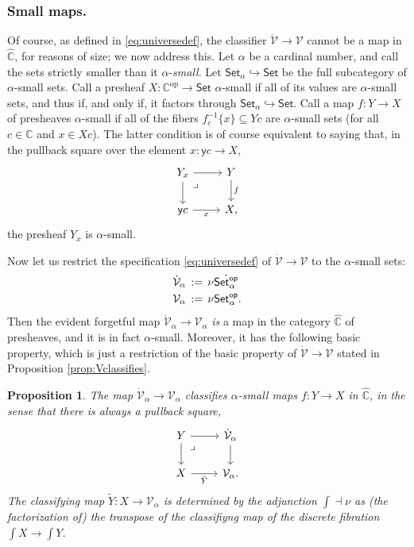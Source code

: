 \documentclass[11pt,reqno]{amsart}
\newcommand{\bbC}{\ensuremath{\mathbb{C}}}
\newcommand{\Set}{\ensuremath{\mathsf{Set}}}
\newcommand{\y}{\ensuremath{\mathsf{y}}} %
\newcommand{\op}[1]{\ensuremath{{#1}^{\mathrm{op}}}}
\newcommand{\hook}{\ensuremath{\hookrightarrow}}
\renewcommand{\to}{\ensuremath{\rightarrow}}
\newcommand{\elem}[1]{\textstyle\int\!{#1}}%
\newcommand{\V}{\ensuremath{\mathcal{V}}}
\newcommand{\VV}{\ensuremath{\dot{\mathcal{V}}}}
\newtheorem{proposition}[theorem]{Proposition}
\theoremstyle{remark}
\theoremstyle{definition}
\newcommand{\pbmark}{\ar[dr, phantom, "\lrcorner" very near start, shift right=.5ex]}	%
\begin{document}
\subsubsection*{Small maps.}
 
Of course, as defined in \eqref{eq:universedef}, the classifier $\VV\to\V$ cannot be a map in $\widehat{\bbC}$, for reasons of size; we now address this.  
Let $\alpha$ be a cardinal number, and call the sets strictly smaller than it $\alpha$-\emph{small}.  Let $\Set_\alpha\hook\Set$ be the full subcategory of $\alpha$-small sets.  
Call a presheaf $X : \op{\bbC} \to \Set$ $\alpha$-small if all of its values are $\alpha$-small sets, and thus if, and only if, it factors through $\Set_\alpha\hook\Set$. Call a map $f:Y\to X$ of presheaves $\alpha$-small if all of the fibers $f_c^{-1}\{ x\} \subseteq Yc$ are $\alpha$-small sets (for all $c\in\bbC$ and $x\in Xc$). The latter condition is of course equivalent to saying that, in the pullback square over the element $x:\y{c} \to X$, 
\begin{equation}\label{eq:smallmap}\textstyle
\begin{tikzcd}
	 Y_x \ar[d] \pbmark \ar[r] & Y \ar[d, "f"] \\  
	\y{c} \ar[r,swap,"x"] &  X,
 \end{tikzcd}
 \end{equation}
the presheaf $Y_x$ is $\alpha$-small.

Now let us restrict the specification \eqref{eq:universedef} of $\VV\to\V$ to the $\alpha$-small sets:
\begin{align}\label{eq:universedefalpha}\textstyle
\VV_\alpha\, &:=\, \nu \dot{\Set^{\mathsf{op}}_\alpha}\\  
\V_\alpha\, &:=\, \nu \Set^{\mathsf{op}}_\alpha. \notag
 \end{align}
Then the evident forgetful map $\VV_\alpha\to\V_\alpha$ \emph{is} a map in the category $\widehat{\bbC}$ of presheaves, and it is in fact $\alpha$-small. Moreover, it has the following basic property, which is just a restriction of the basic property of $\VV\to\V$ stated in Proposition \ref{prop:Vclassifies}.

 \begin{proposition}\label{prop:familyclassifier}
The map $\VV_\alpha\to\V_\alpha$ classifies $\alpha$-small maps $f:Y\to X$ in $\widehat{\bbC}$, in the sense that there is always a pullback square,
\begin{equation}\label{eq:classifyuniversefamilyalpha}\textstyle
\begin{tikzcd}
	 Y \ar[d] \pbmark \ar[r] & \VV_\alpha \ar[d] \\  
	X \ar[r,swap, "\tilde{Y}"] &  \V_\alpha.
 \end{tikzcd}
 \end{equation}
The classifying map $\tilde{Y} : X\to \V_\alpha$ is determined by the adjunction $\int \dashv \nu$ as (the factorization of) the transpose of the classifiyng map of the discrete fibration $\elem X\to\elem Y$. 
\end{proposition}
\end{document}
